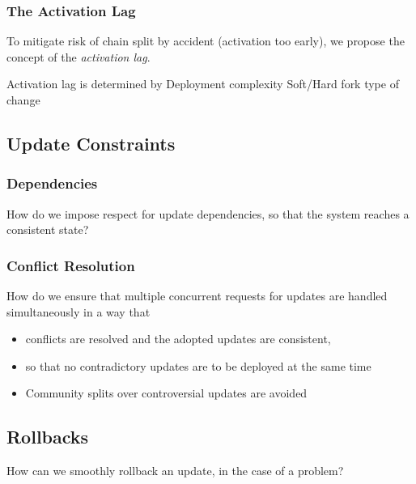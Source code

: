\subsubsection{The Activation Lag}
To mitigate risk of chain split by accident (activation too early), we propose the concept of the \emph{activation lag}.

Activation lag is determined by
Deployment complexity
Soft/Hard fork type of change




\subsection{Update Constraints}

\subsubsection{Dependencies}
How do we impose respect for update dependencies, so that the system reaches a consistent state? 


\subsubsection{Conflict Resolution}
How do we ensure that multiple concurrent requests for updates are handled simultaneously in a way that
\begin{itemize}
\item conflicts are resolved and the adopted updates are consistent, 
\item so that no contradictory updates are to be deployed at the same time
\item Community splits over controversial updates are avoided
\end{itemize}


\subsection{Rollbacks}
How can we smoothly rollback an update, in the case of a problem?


